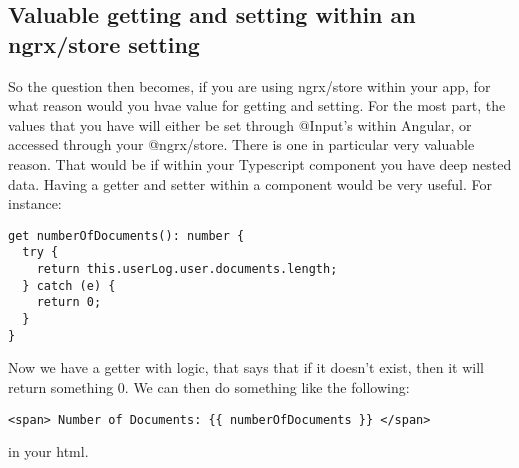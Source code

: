 \subsection{ Valuable getting and setting within an ngrx/store setting }
So the question then becomes, if you are using ngrx/store within your app, for
what reason would you hvae value for getting and setting. For the most part, the
values that you have will either be set through @Input's within Angular, or
accessed through your @ngrx/store. There is one in particular very valuable
reason. That would be if within your Typescript component you have deep nested
data. Having a getter and setter within a component would be very useful. For
instance:
\begin{lstlisting}
get numberOfDocuments(): number {
  try {
    return this.userLog.user.documents.length;
  } catch (e) {
    return 0;
  }
}
\end{lstlisting}
Now we have a getter with logic, that says that if it doesn't exist, then it
will return something 0. We can then do something like the following:
\begin{verbatim}
<span> Number of Documents: {{ numberOfDocuments }} </span>
\end{verbatim}
in your html.
